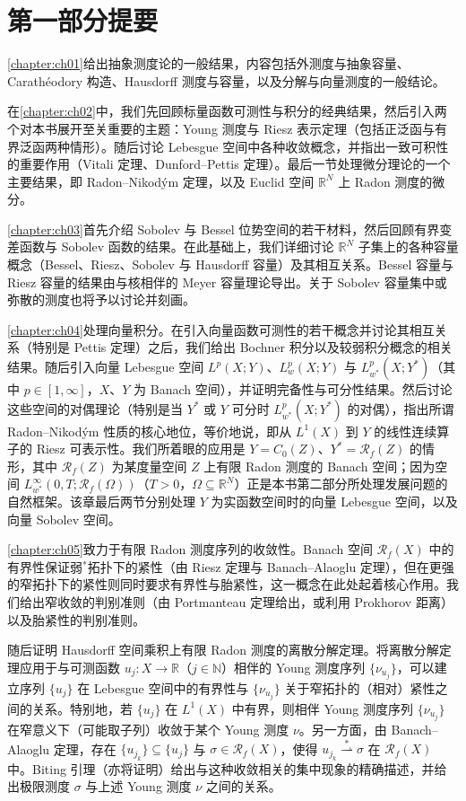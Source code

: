 \documentclass[../main.tex]{subfiles}
\begin{document}
\section*{第一部分提要}\label{section:part1-outline}

\cref{chapter:ch01}给出抽象测度论的一般结果，内容包括外测度与抽象容量、Carathéodory 构造、Hausdorff 测度与容量，以及分解与向量测度的一般结论。

在\cref{chapter:ch02}中，我们先回顾标量函数可测性与积分的经典结果，然后引入两个对本书展开至关重要的主题：Young 测度与 Riesz 表示定理（包括正泛函与有界泛函两种情形）。随后讨论 Lebesgue 空间中各种收敛概念，并指出一致可积性的重要作用（Vitali 定理、Dunford--Pettis 定理）。最后一节处理微分理论的一个主要结果，即 Radon--Nikodým 定理，以及 Euclid 空间 $\mathbb{R}^N$ 上 Radon 测度的微分。

\cref{chapter:ch03}首先介绍 Sobolev 与 Bessel 位势空间的若干材料，然后回顾有界变差函数与 Sobolev 函数的结果。在此基础上，我们详细讨论 $\mathbb{R}^N$ 子集上的各种容量概念（Bessel、Riesz、Sobolev 与 Hausdorff 容量）及其相互关系。Bessel 容量与 Riesz 容量的结果由与核相伴的 Meyer 容量理论导出。关于 Sobolev 容量集中或弥散的测度也将予以讨论并刻画。

\cref{chapter:ch04}处理向量积分。在引入向量函数可测性的若干概念并讨论其相互关系（特别是 Pettis 定理）之后，我们给出 Bochner 积分以及较弱积分概念的相关结果。随后引入向量 Lebesgue 空间 $L^p(X;Y)$、$L^p_w(X;Y)$ 与 $L^p_{w^*}(X;Y^*)$（其中 $p\in[1,\infty]$，$X$、$Y$ 为 Banach 空间），并证明完备性与可分性结果。然后讨论这些空间的对偶理论（特别是当 $Y^*$ 或 $Y$ 可分时 $L^p_{w^*}(X;Y^*)$ 的对偶），指出所谓 Radon--Nikodým 性质的核心地位，等价地说，即从 $L^1(X)$ 到 $Y$ 的线性连续算子的 Riesz 可表示性。我们所着眼的应用是 $Y=C_0(Z)$、$Y^*=\mathscr{R}_f(Z)$ 的情形，其中 $\mathscr{R}_f(Z)$ 为某度量空间 $Z$ 上有限 Radon 测度的 Banach 空间；因为空间 $L^\infty_{w^*}(0,T;\mathscr{R}_f(\Omega))$（$T>0$，$\Omega\subseteq\mathbb{R}^N$）正是本书第二部分所处理发展问题的自然框架。该章最后两节分别处理 $Y$ 为实函数空间时的向量 Lebesgue 空间，以及向量 Sobolev 空间。

\cref{chapter:ch05}致力于有限 Radon 测度序列的收敛性。Banach 空间 $\mathscr{R}_f(X)$ 中的有界性保证弱$^*$拓扑下的紧性（由 Riesz 定理与 Banach--Alaoglu 定理），但在更强的窄拓扑下的紧性则同时要求有界性与胎紧性，这一概念在此处起着核心作用。我们给出窄收敛的判别准则（由 Portmanteau 定理给出，或利用 Prokhorov 距离）以及胎紧性的判别准则。

随后证明 Hausdorff 空间乘积上有限 Radon 测度的离散分解定理。将离散分解定理应用于与可测函数 $u_j:X\to\mathbb{R}$（$j\in\mathbb{N}$）相伴的 Young 测度序列 $\{\nu_{u_j}\}$，可以建立序列 $\{u_j\}$ 在 Lebesgue 空间中的有界性与 $\{\nu_{u_j}\}$ 关于窄拓扑的（相对）紧性之间的关系。特别地，若 $\{u_j\}$ 在 $L^1(X)$ 中有界，则相伴 Young 测度序列 $\{\nu_{u_j}\}$ 在窄意义下（可能取子列）收敛于某个 Young 测度 $\nu$。另一方面，由 Banach--Alaoglu 定理，存在 $\{u_{j_k}\}\subseteq\{u_j\}$ 与 $\sigma\in\mathscr{R}_f(X)$，使得 $u_{j_k}\stackrel{*}{\rightharpoonup}\sigma$ 在 $\mathscr{R}_f(X)$ 中。Biting 引理（亦将证明）给出与这种收敛相关的集中现象的精确描述，并给出极限测度 $\sigma$ 与上述 Young 测度 $\nu$ 之间的关系。
\end{document}
